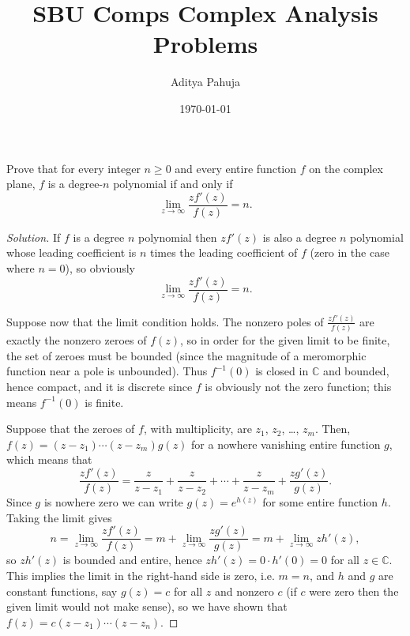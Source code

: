 \documentclass[10pt]{article}
\providecommand{\CC}{\mathbb C}
\providecommand{\inv}{^{-1}}
\newenvironment{soln}{\begin{proof}[Solution]}{\end{proof}}
\begin{document}
\title{SBU Comps Complex Analysis Problems}
\author{Aditya Pahuja}
\date{\today}
\maketitle

\begin{problem}
[2026 J-I-3]
Prove that for every integer $n\geq 0$ and every entire function $f$ on the complex plane, $f$ is a degree-$n$ polynomial if and only if
$$
\lim_{z\to\infty}\frac{zf'(z)}{f(z)}=n.
$$
\end{problem}

\begin{soln}
    If $f$ is a degree $n$ polynomial
    then $zf'(z)$ is also a degree $n$ polynomial
    whose leading coefficient is $n$ times
    the leading coefficient of $f$ (zero in the case where $n=0$),
    so obviously
    \begin{equation*}
	\lim_{z\to\infty}\frac{zf'(z)}{f(z)} = n.
    \end{equation*}

    Suppose now that the limit condition holds.
    The nonzero poles of $\frac{zf'(z)}{f(z)}$ are
    exactly the nonzero zeroes of $f(z)$,
    so in order for the given limit to be finite,
    the set of zeroes must be bounded
    (since the magnitude of a meromorphic function
    near a pole is unbounded).
    Thus $f\inv(0)$ is closed in $\CC$ and bounded,
    hence compact, and it is discrete since $f$ is obviously
    not the zero function; this means $f\inv(0)$ is finite.

    Suppose that the zeroes of $f$,
    with multiplicity, are $z_1$, $z_2$, \dots, $z_m$.
    Then, $f(z) = (z - z_1)\cdots(z - z_m)g(z)$
    for a nowhere vanishing entire function $g$,
    which means that
    \begin{equation*}
	\frac{zf'(z)}{f(z)}
	= \frac{z}{z - z_1} + \frac{z}{z - z_2}
	+ \cdots + \frac{z}{z - z_m}
	+ \frac{zg'(z)}{g(z)}.
    \end{equation*}
    Since $g$ is nowhere zero we can write
    $g(z) = e^{h(z)}$ for some entire function $h$.
    Taking the limit gives
    \begin{equation*}
	n = \lim_{z\to\infty} \frac{zf'(z)}{f(z)}
	= m + \lim_{z\to\infty} \frac{zg'(z)}{g(z)}
	= m + \lim_{z\to\infty} zh'(z),
    \end{equation*}
    so $zh'(z)$ is bounded and entire, hence
    $zh'(z) = 0\cdot h'(0) = 0$ for all $z\in\CC$.
    This implies the limit in the right-hand side is zero,
    i.e. $m = n$, and $h$ and $g$ are constant functions,
    say $g(z) = c$ for all $z$ and nonzero $c$
    (if $c$ were zero then the given limit would not make sense),
    so we have shown that $f(z) = c(z - z_1)\cdots(z - z_n)$.
\end{soln}
\end{document}
